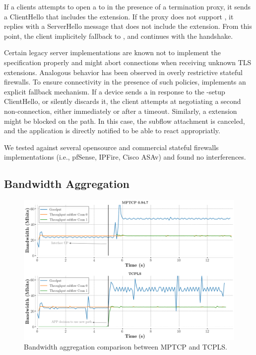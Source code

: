 If a clients attempts to open a \tcpls to in the presence of a \tls termination
proxy, it sends a ClientHello that includes the \tcpls extension. If the proxy
does not support \tcpls, it replies with a ServerHello message that does not
include the \tcpls extension. From this point, the client implicitely fallback
to \tls, and continues with the handshake.

Certain legacy \tls server implementations are known not to implement the \tls
specification properly and might abort connections when receiving unknown TLS
extensions. Analogous behavior has been observed in overly restrictive stateful
firewalls.  To ensure connectivity in the presence of such policies, \tcpls
implements an explicit fallback mechanism. If a device sends a \tcp \rst in
response to the \tcpls-setup ClientHello, or silently discards it, the client
attempts at negotiating a second non-\tcpls \tls connection, either immediately
or after a timeout. Similarly, a \tcpls \join extension might be blocked on the
path. In this case, the subflow attachment is canceled, and the application
is directly notified to be able to react appropriatly.

We tested \tcpls against several opensource and commercial stateful firewalls
implementations (i.e., pfSense, IPFire, Cisco ASAv) and found no interferences.

\subsection{Bandwidth Aggregation}

\begin{figure}[!t]
  \begin{center}
    \includegraphics[width=\columnwidth]{figures/aggregate_dual.png}
  \end{center}
  \caption{Bandwidth aggregation comparison between MPTCP and TCPLS.}
\end{figure}

